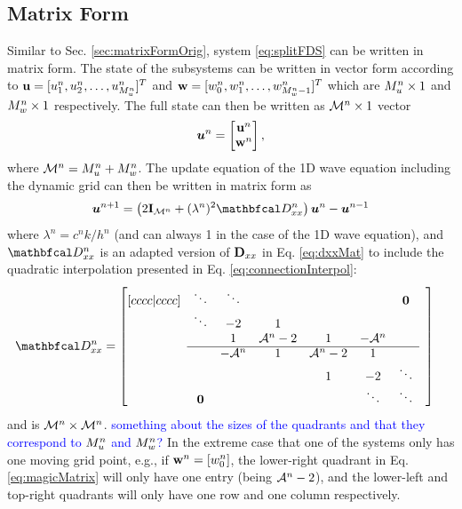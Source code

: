 \documentclass[fleqn]{jaes}
\def\SWcomment[#1]{\textcolor{blue}{#1}}
\begin{document}
\subsection{Matrix Form}\label{sec:matrixForm}
Similar to Sec. \ref{sec:matrixFormOrig}, system \eqref{eq:splitFDS} can be written in matrix form. The state of the subsystems can be written in vector form according to $\mathbf{u} = [u_1^n, u_2^n, \hdots, u_{M_u^n}^n]^T$ and $\mathbf{w} = [w_0^n, w_1^n, \hdots, w_{M_w^n-1}^n]^T$ which are $M_u^n \times 1$ and $M_w^n \times 1$ respectively. The full state can then be written as ${\mathcal{M}^n} \times 1$ vector
\begin{equation}\label{eq:uStack}
    \uStack^n = \begin{bmatrix}
    \u^n\\
    \w^n
    \end{bmatrix},
\end{equation}
where ${\mathcal{M}^n} = M_u^n + M_w^n$.
The update equation of the 1D wave equation including the dynamic grid can then be written in matrix form as
\begin{equation}\label{eq:1DwaveDynMatrix}
    \uStack^{n+1} = \left(2\I_\MoneD + (\lambda^n)^2\DDxx\right)\uStack^n - \uStack^{n-1} 
\end{equation}
where $\lambda^n = c^nk/h^n$ (and can always 1 in the case of the 1D wave equation), and $\DDxx$ is an adapted version of $\mathbf{D}_{xx}$ in Eq. \eqref{eq:dxxMat} to include the quadratic interpolation presented in Eq. \eqref{eq:connectionInterpol}:
\begin{equation}\label{eq:magicMatrix}
    \!\!\!\!\!\!\DDxx = \begin{bmatrix}[cccc|cccc]
     & \ddots  &\ddots & & & & \boldsymbol{0} & \\
       & \ddots & -2 & 1 & & & & \\
      & & 1 & \Aterm -2 & 1 & -\Aterm & \\ \cline{2-7}
      & & -\Aterm & 1 & \Aterm -2 & 1 & & \\
         & & & &1 & -2 & \ddots  \\
         & \boldsymbol{0} & &  &  &\ddots & \ddots &
    \end{bmatrix}
\end{equation}
and is ${\mathcal{M}^n} \times {\mathcal{M}^n}$. \SWcomment[something about the sizes of the quadrants and that they correspond to $M_u^n$ and $M_w^n$?] In the extreme case that one of the systems only has one moving grid point, e.g., if $\mathbf{w}^n =[w_0^n]$, the lower-right quadrant in Eq. \eqref{eq:magicMatrix} will only have one entry (being $\mathcal{A}^n-2$), and the lower-left and top-right quadrants will only have one row and one column respectively. 
\end{document}
